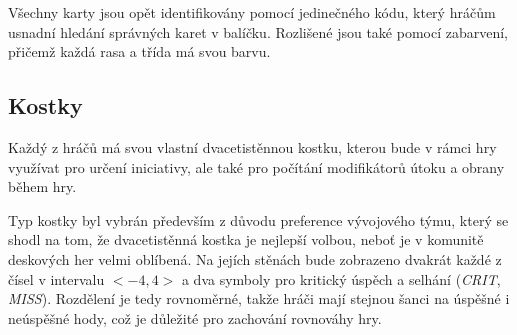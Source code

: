 Všechny karty jsou opět identifikovány pomocí jedinečného kódu, který hráčům usnadní hledání správných karet v balíčku. Rozlišené jsou také pomocí zabarvení, přičemž každá rasa a třída má svou barvu.

\subsection{Kostky}
\label{subsec:design_dice}

Každý z hráčů má svou vlastní dvacetistěnnou kostku, kterou bude v rámci hry využívat pro určení iniciativy, ale také pro počítání modifikátorů útoku a obrany během hry.

Typ kostky byl vybrán především z důvodu preference vývojového týmu, který se shodl na tom, že dvacetistěnná kostka je nejlepší volbou, neboť je v komunitě deskových her velmi oblíbená. Na jejích stěnách bude zobrazeno dvakrát každé z čísel v intervalu $<-4, 4>$ a dva symboly pro kritický úspěch a selhání (\textit{CRIT}, \textit{MISS}). Rozdělení je tedy rovnoměrné, takže hráči mají stejnou šanci na úspěšné i neúspěšné hody, což je důležité pro zachování rovnováhy hry.
